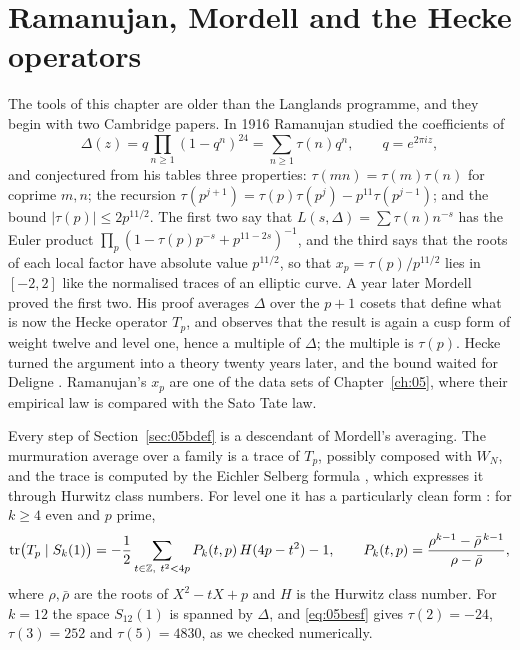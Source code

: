\section{Ramanujan, Mordell and the Hecke operators}\label{sec:05bram}

The tools of this chapter are older than the Langlands programme, and they begin with two Cambridge papers. In 1916 Ramanujan \cite{ramanujan1916} studied the coefficients of
\[
\Delta(z)=q\prod_{n\ge1}(1-q^n)^{24}=\sum_{n\ge1}\tau(n)q^n,\qquad q=e^{2\pi iz},
\]
and conjectured from his tables three properties: $\tau(mn)=\tau(m)\tau(n)$ for coprime $m,n$; the recursion $\tau(p^{j+1})=\tau(p)\tau(p^j)-p^{11}\tau(p^{j-1})$; and the bound $|\tau(p)|\le2p^{11/2}$. The first two say that $L(s,\Delta)=\sum\tau(n)n^{-s}$ has the Euler product $\prod_p(1-\tau(p)p^{-s}+p^{11-2s})^{-1}$, and the third says that the roots of each local factor have absolute value $p^{11/2}$, so that $x_p=\tau(p)/p^{11/2}$ lies in $[-2,2]$ like the normalised traces of an elliptic curve. A year later Mordell \cite{mordell1917} proved the first two. His proof averages $\Delta$ over the $p+1$ cosets that define what is now the Hecke operator $T_p$, and observes that the result is again a cusp form of weight twelve and level one, hence a multiple of $\Delta$; the multiple is $\tau(p)$. Hecke \cite{hecke1937} turned the argument into a theory twenty years later, and the bound waited for Deligne \cite{deligne1974}. Ramanujan's $x_p$ are one of the data sets of Chapter~\ref{ch:05}, where their empirical law is compared with the Sato Tate law.

Every step of Section~\ref{sec:05bdef} is a descendant of Mordell's averaging. The murmuration average over a family is a trace of $T_p$, possibly composed with $W_N$, and the trace is computed by the Eichler Selberg formula \cite{eichler1973,selberg1956}, which expresses it through Hurwitz class numbers. For level one it has a particularly clean form \cite{zagier1977}: for $k\ge4$ even and $p$ prime,
\begin{equation}\label{eq:05besf}
\operatorname{tr}\bigl(T_p\mid S_k(1)\bigr)=-\frac12\sum_{t\in\Z,\ t^2<4p}P_k(t,p)\,H(4p-t^2)-1,\qquad P_k(t,p)=\frac{\rho^{k-1}-\bar\rho^{\,k-1}}{\rho-\bar\rho},
\end{equation}
where $\rho,\bar\rho$ are the roots of $X^2-tX+p$ and $H$ is the Hurwitz class number. For $k=12$ the space $S_{12}(1)$ is spanned by $\Delta$, and \eqref{eq:05besf} gives $\tau(2)=-24$, $\tau(3)=252$ and $\tau(5)=4830$, as we checked numerically.

